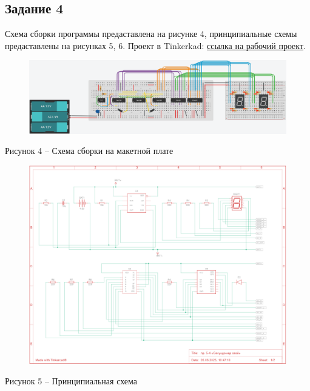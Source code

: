 \documentclass[a4paper,14pt]{extarticle}
\begin{document}
  \subsection*{\hspace{12.5mm}Задание 4}
  Схема сборки программы предаставлена на рисунке 4, принципиальные схемы предаставлены на рисунках 5, 6. Проект в Tinkerkad: \href{https://www.tinkercad.com/things/9LRhfF1oQmo-lr-5-4-sekundomer-svoj/editel?returnTo=%2Fdashboard%2Fdesigns%2Fcircuits&sharecode=n5FTfD2rEv6k9KspowbLXgFeYkuGrLGAqGDjJiEGe1k}{ссылка на рабочий проект}.

  \begin{figure}[h]
    \centering
    \includegraphics[width=1\linewidth]{images/image-4}
  \end{figure}
  \begin{center}
    Рисунок 4 – Схема сборки на макетной плате
  \end{center}

  \begin{figure}[h]
    \centering
    \includegraphics[width=0.72\linewidth]{images/image-5}
  \end{figure}
  \begin{center}
    Рисунок 5 – Принципиальная схема
  \end{center}

  \pagebreak
\end{document}
